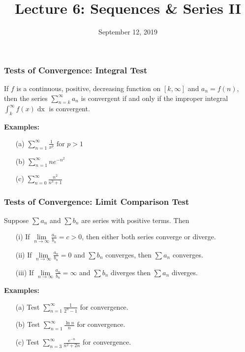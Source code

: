 \documentclass{beamer}
\title{Lecture 6: Sequences \& Series II}
\date{September 12, 2019}
\begin{document}
	
\frame{\titlepage}



\begin{frame}
\frametitle{Tests of Convergence: Integral Test}
If $f$ is a continuous, positive, decreasing function on $[k,\infty]$ and $a_n = f(n)$, then the series $\sum_{n=k}^\infty a_n$ is convergent if and only if the improper integral $\int_k^\infty f(x)\mathop{dx}$ is convergent.

\vspace{12pt}
\textbf{Examples:}
\begin{itemize}
	\item[(a)] $\sum_{n=1}^\infty \frac{1}{x^p} \mbox{ for } p > 1$
	\item[(b)] $\sum_{n=1}^\infty n e^{-n^2}$
	\item[(c)] $\sum_{n=0}^\infty \frac{n^2}{n^3+1}$
\end{itemize}
\end{frame}

\begin{frame}
\frametitle{Tests of Convergence: Limit Comparison Test}
Suppose $\sum a_n$ and $\sum  b_n$ are series with positive terms. Then
\begin{itemize}
	\item[(i)] If $\lim\limits_{n \to \infty} \frac{a_n}{b_n} = c> 0$, then either both series converge or diverge.
	\item[(ii)] If $\lim\limits_{n \to \infty} \frac{a_n}{b_n} =  0$ and $\sum  b_n$ converges, then $\sum  a_n$ converges.
	\item[(iii)] If $\lim\limits_{n \to \infty} \frac{a_n}{b_n} =  \infty$ and $\sum  b_n$ diverges then $\sum a_n$ diverges.
\end{itemize}

\vspace{12pt}
\textbf{Examples:}
\begin{itemize}
	\item[(a)] Test $\sum_{n=1}^\infty \frac{1}{2^n-1}$ for convergence.
	\item[(b)] Test $\sum_{n=1}^\infty \frac{\ln n}{n}$ for convergence.
	\item[(c)] Test $\sum_{n=3}^\infty \frac{e^{-n}}{n^2 + 2n}$ for convergence.
\end{itemize}
\end{frame}
\end{document}
